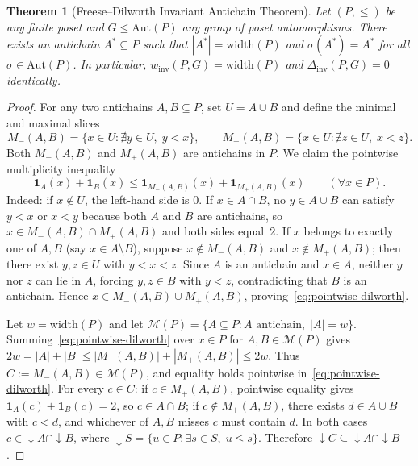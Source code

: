 \documentclass[11pt,a4paper]{article}
\newtheorem{theorem}{Theorem}[section]
\theoremstyle{definition}
\newcommand{\Aut}{\mathrm{Aut}}
\newcommand{\width}{\mathrm{width}}
\newcommand{\winv}{w_{\mathrm{inv}}}
\newcommand{\Dinv}{\Delta_{\mathrm{inv}}}
\begin{document}
\begin{theorem}[Freese--Dilworth Invariant Antichain Theorem]\label{thm:freese-dilworth}
Let $(P,\le)$ be any finite poset and $G \le \Aut(P)$ any group of poset automorphisms. There exists an antichain $A^* \subseteq P$ such that $|A^*| = \width(P)$ and $\sigma(A^*) = A^*$ for all $\sigma \in \Aut(P)$. In particular, $\winv(P,G) = \width(P)$ and $\Dinv(P,G) = 0$ identically.
\end{theorem}

\begin{proof}
For any two antichains $A, B \subseteq P$, set $U = A \cup B$ and define the minimal and maximal slices
\[
  M_-(A,B) = \{x \in U : \nexists y \in U,\; y < x\}, \qquad
  M_+(A,B) = \{x \in U : \nexists z \in U,\; x < z\}.
\]
Both $M_-(A,B)$ and $M_+(A,B)$ are antichains in $P$. We claim the pointwise multiplicity inequality
\begin{equation}\label{eq:pointwise-dilworth}
  \mathbf{1}_A(x) + \mathbf{1}_B(x) \le \mathbf{1}_{M_-(A,B)}(x) + \mathbf{1}_{M_+(A,B)}(x) \qquad (\forall x \in P).
\end{equation}
Indeed: if $x \notin U$, the left-hand side is $0$. If $x \in A \cap B$, no $y \in A \cup B$ can satisfy $y < x$ or $x < y$ because both $A$ and $B$ are antichains, so $x \in M_-(A,B) \cap M_+(A,B)$ and both sides equal~$2$. If $x$ belongs to exactly one of $A, B$ (say $x \in A \setminus B$), suppose $x \notin M_-(A,B)$ and $x \notin M_+(A,B)$; then there exist $y, z \in U$ with $y < x < z$. Since $A$ is an antichain and $x \in A$, neither $y$ nor $z$ can lie in $A$, forcing $y, z \in B$ with $y < z$, contradicting that $B$ is an antichain. Hence $x \in M_-(A,B) \cup M_+(A,B)$, proving~\eqref{eq:pointwise-dilworth}.

Let $w = \width(P)$ and let $\mathcal{M}(P) = \{A \subseteq P : A \text{ antichain},\; |A| = w\}$. Summing~\eqref{eq:pointwise-dilworth} over $x \in P$ for $A, B \in \mathcal{M}(P)$ gives $2w = |A| + |B| \le |M_-(A,B)| + |M_+(A,B)| \le 2w$. Thus $C := M_-(A,B) \in \mathcal{M}(P)$, and equality holds pointwise in~\eqref{eq:pointwise-dilworth}. For every $c \in C$: if $c \in M_+(A,B)$, pointwise equality gives $\mathbf{1}_A(c) + \mathbf{1}_B(c) = 2$, so $c \in A \cap B$; if $c \notin M_+(A,B)$, there exists $d \in A \cup B$ with $c < d$, and whichever of $A, B$ misses $c$ must contain $d$. In both cases $c \in {\downarrow}A \cap {\downarrow}B$, where ${\downarrow}S = \{u \in P : \exists s \in S,\; u \le s\}$. Therefore ${\downarrow}C \subseteq {\downarrow}A \cap {\downarrow}B$.


\end{proof}
\end{document}
